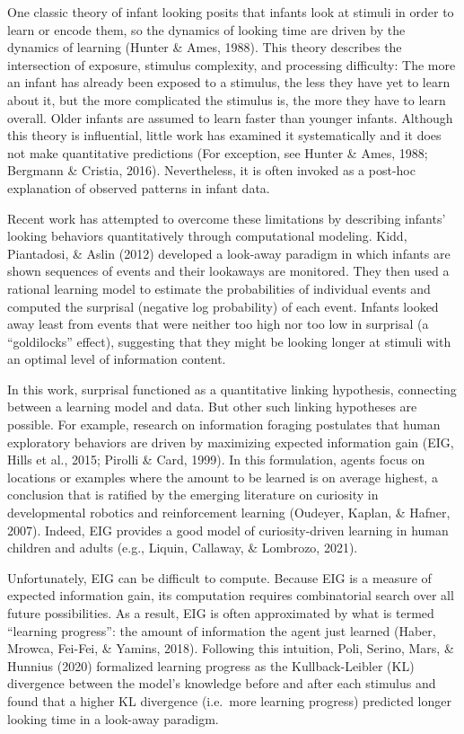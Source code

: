 \documentclass[10pt, letterpaper]{article}
\begin{document}
One classic theory of infant looking posits that infants look at stimuli
in order to learn or encode them, so the dynamics of looking time are
driven by the dynamics of learning (Hunter \& Ames, 1988). This theory
describes the intersection of exposure, stimulus complexity, and
processing difficulty: The more an infant has already been exposed to a
stimulus, the less they have yet to learn about it, but the more
complicated the stimulus is, the more they have to learn overall. Older
infants are assumed to learn faster than younger infants. Although this
theory is influential, little work has examined it systematically and it
does not make quantitative predictions (For exception, see Hunter \&
Ames, 1988; Bergmann \& Cristia, 2016). Nevertheless, it is often
invoked as a post-hoc explanation of observed patterns in infant data.

Recent work has attempted to overcome these limitations by describing
infants' looking behaviors quantitatively through computational
modeling. Kidd, Piantadosi, \& Aslin (2012) developed a look-away
paradigm in which infants are shown sequences of events and their
lookaways are monitored. They then used a rational learning model to
estimate the probabilities of individual events and computed the
surprisal (negative log probability) of each event. Infants looked away
least from events that were neither too high nor too low in surprisal (a
``goldilocks'' effect), suggesting that they might be looking longer at
stimuli with an optimal level of information content.

In this work, surprisal functioned as a quantitative linking hypothesis,
connecting between a learning model and data. But other such linking
hypotheses are possible. For example, research on information foraging
postulates that human exploratory behaviors are driven by maximizing
expected information gain (EIG, Hills et al., 2015; Pirolli \& Card,
1999). In this formulation, agents focus on locations or examples where
the amount to be learned is on average highest, a conclusion that is
ratified by the emerging literature on curiosity in developmental
robotics and reinforcement learning (Oudeyer, Kaplan, \& Hafner, 2007).
Indeed, EIG provides a good model of curiosity-driven learning in human
children and adults (e.g., Liquin, Callaway, \& Lombrozo, 2021).

Unfortunately, EIG can be difficult to compute. Because EIG is a measure
of expected information gain, its computation requires combinatorial
search over all future possibilities. As a result, EIG is often
approximated by what is termed ``learning progress'': the amount of
information the agent just learned (Haber, Mrowca, Fei-Fei, \& Yamins,
2018). Following this intuition, Poli, Serino, Mars, \& Hunnius (2020)
formalized learning progress as the Kullback-Leibler (KL) divergence
between the model's knowledge before and after each stimulus and found
that a higher KL divergence (i.e.~more learning progress) predicted
longer looking time in a look-away paradigm.
\end{document}

